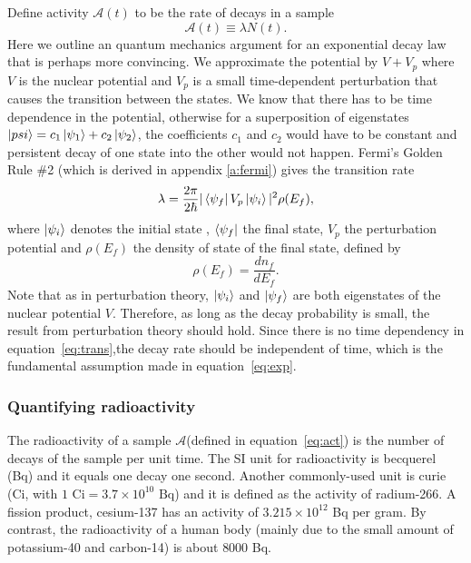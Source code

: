 \documentclass[preprint,aip,pra]{revtex4-1}
\begin{document}
        Define activity $\mathcal{A}(t)$ to be the rate of decays in a sample
        \begin{equation} \label{eq:act}
            \mathcal{A}(t)\equiv \lambda N(t).
        \end{equation}
        Here we outline an quantum mechanics argument for an exponential decay law that is perhaps more
        convincing.
        We approximate the potential by $V+V_p$ where $V$ is the nuclear potential and $V_p$ is a small
        time-dependent perturbation that causes the transition between the states. We know that there has
        to be time dependence in the potential, otherwise for a superposition of eigenstates
        $\ket{psi}=c_1\ket{\psi_1} + c_2\ket{\psi_2}$, the coefficients $c_1$ and $c_2$ would 
        have to be constant and
        persistent decay of one state into the other would not happen.
        Fermi's Golden Rule \#2 (which is derived in appendix \ref{a:fermi})
        gives the transition rate
        \begin{equation}
            \label{eq:trans}
            \lambda = \frac{2\pi}{2\hbar}|\bra{\psi_f}V_p\ket{\psi_i}|^2\rho(E_f),
        \end{equation}
        where $\ket{\psi_i}$ denotes the initial state , $\bra{\psi_f}$ the final state, $V_p$ the perturbation
        potential and $\rho(E_f)$ the density of state of the final state, defined by
        \begin{equation}
            \rho(E_f) = \frac{dn_f}{dE_f}.
        \end{equation}
        Note that as in perturbation theory, $\ket{\psi_i}$ and
        $\ket{\psi_f}$ are both eigenstates of the nuclear potential $V$. Therefore, as long as
        the decay probability is small, the result from perturbation theory should hold. Since
        there is no time dependency in equation~\ref{eq:trans},the
        decay rate should be independent of time, which is the fundamental assumption made in
        equation~\ref{eq:exp}.

        \subsubsection{Quantifying radioactivity}
        The radioactivity of a sample $\mathcal{A}$(defined in equation~\ref{eq:act}) 
        is the number of decays of the sample per unit time. The SI
        unit for radioactivity is becquerel (Bq) and it equals one decay one second. Another commonly-used
        unit is curie (Ci, with $1\text{ Ci}=3.7\times 10^{10}\text{ Bq}$) and it is defined as
        the activity of radium-266. A fission product, cesium-137 has an activity of $3.215\times 10^{12}$ Bq
        per gram. By contrast, the radioactivity of a human body (mainly due to the small amount of 
        potassium-40 and carbon-14) is about $8000$ Bq.
\end{document}
